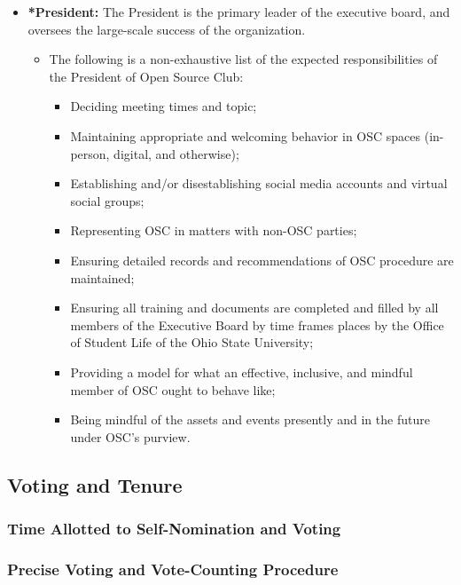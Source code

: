 \documentclass[12pt,letterpaper]{article}
\begin{document}
\begin{itemize}
  \item \textbf{*President:} The President is the primary leader of the executive board,
    and oversees the large-scale success of the organization.
    \begin{itemize}
      \item The following is a non-exhaustive list of the expected responsibilities of
        the President of Open Source Club:
        \begin{itemize}
          \item Deciding meeting times and topic;
          \item Maintaining appropriate and welcoming behavior in OSC spaces (in-person,
            digital, and otherwise);
          \item Establishing and/or disestablishing social media accounts and virtual
            social groups;
          \item Representing OSC in matters with non-OSC parties;
          \item Ensuring detailed records and recommendations of OSC procedure are
            maintained;
          \item Ensuring all training and documents are completed and filled by all
            members of the Executive Board by time frames places by the Office of Student
            Life of the Ohio State University;
          \item Providing a model for what an effective, inclusive, and mindful member of
            OSC ought to behave like;
          \item Being mindful of the assets and events presently and in the future under
            OSC's purview.
        \end{itemize}
    \end{itemize}
\end{itemize}

\subsection{Voting and Tenure}

\subsubsection{Time Allotted to Self-Nomination and Voting}
\subsubsection{Precise Voting and Vote-Counting Procedure}
\end{document}
